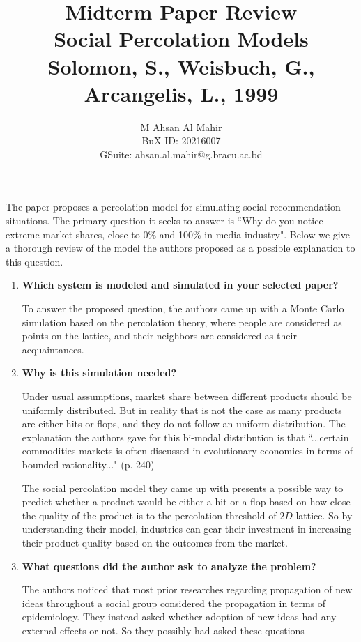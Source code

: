 \documentclass[article, 11pt, a4paper]{memoir}
\title{\vspace{-3.5em}\Large\textbf{Midterm Paper Review}\\[1em] \LARGE \textbf{Social
Percolation Models} \\ \Large Solomon, S., Weisbuch, G., Arcangelis, L., 1999}
\author{M Ahsan Al Mahir\\ \small BuX ID: 20216007\\ \small GSuite: ahsan.al.mahir@g.bracu.ac.bd}
\begin{document}
\maketitle


The paper proposes a percolation model for simulating social recommendation situations.
The primary question it seeks to answer is ``Why do you notice extreme market shares,
close to 0\% and 100\% in media industry". Below we give a thorough review of the model
the authors proposed as a possible explanation to this question.


\begin{enumerate}[left=0pt, itemsep=20pt, label={\(\square\)}]

    \item \textbf{Which system is modeled and simulated in your selected paper? }

        To answer the proposed question, the authors came up with a Monte Carlo simulation
        based on the percolation theory, where people are considered as points on the
        lattice, and their neighbors are considered as their acquaintances. 

    \item \textbf{Why is this simulation needed? }

        Under usual assumptions, market share between different products should be
        uniformly distributed. But in reality that is not the case as many products are
        either hits or flops, and they do not follow an uniform distribution. The
        explanation the authors gave for this bi-modal distribution is that ``...certain
        commodities markets is often discussed in evolutionary economics in terms of
        bounded rationality..." (p. 240)

        The social percolation model they came up with presents a possible way to predict
        whether a product would be either a hit or a flop based on how close the quality
        of the product is to the percolation threshold of \(2D\) lattice. So by
        understanding their model, industries can gear their investment in increasing
        their product quality based on the outcomes from the market.

    \item \textbf{What questions did the author ask to analyze the problem? }

        The authors noticed that most prior researches regarding propagation of new ideas
        throughout a social group considered the propagation in terms of epidemiology.
        They instead asked whether adoption of new ideas had any external effects or not.
        So they possibly had asked these questions


\end{enumerate}
\end{document}
